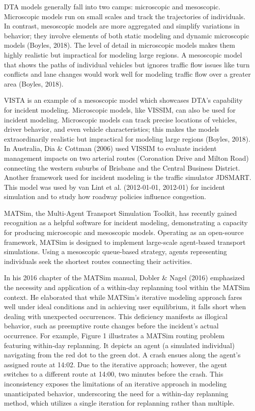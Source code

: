 \documentclass[fancy, oneside, mastersfancy, ms]{byuthesis}
\begin{document}
DTA models generally fall into two camps: microscopic and mesoscopic.
Microscopic models run on small scales and track the trajectories of
individuals. In contrast, mesoscopic models are more aggregated and
simplify variations in behavior; they involve elements of both static
modeling and dynamic microscopic models (Boyles, 2018). The level of
detail in microscopic models makes them highly realistic but impractical
for modeling large regions. A mesoscopic model that shows the paths of
individual vehicles but ignores traffic flow issues like turn conflicts
and lane changes would work well for modeling traffic flow over a
greater area (Boyles, 2018).

VISTA is an example of a mesoscopic model which showcases DTA's
capability for incident modeling. Microscopic models, like VISSIM, can
also be used for incident modeling. Microscopic models can track precise
locations of vehicles, driver behavior, and even vehicle
characteristics; this makes the models extraordinarily realistic but
impractical for modeling large regions (Boyles, 2018). In Australia, Dia
\& Cottman (2006) used VISSIM to evaluate incident management impacts on
two arterial routes (Coronation Drive and Milton Road) connecting the
western suburbs of Brisbane and the Central Business District. Another
framework used for incident modeling is the traffic simulator JDSMART.
This model was used by van Lint et al. (2012-01-01, 2012-01) for
incident simulation and to study how roadway policies influence
congestion.

MATSim, the Multi-Agent Transport Simulation Toolkit, has recently
gained recognition as a helpful software for incident modeling,
demonstrating a capacity for producing microscopic and mesoscopic
models. Operating as an open-source framework, MATSim is designed to
implement large-scale agent-based transport simulations. Using a
mesoscopic queue-based strategy, agents representing individuals seek
the shortest routes connecting their activities.

In his 2016 chapter of the MATSim manual, Dobler \& Nagel (2016)
emphasized the necessity and application of a within-day replanning tool
within the MATSim context. He elaborated that while MATSim's iterative
modeling approach fares well under ideal conditions and in achieving
user equilibrium, it falls short when dealing with unexpected
occurrences. This deficiency manifests as illogical behavior, such as
preemptive route changes before the incident's actual occurrence. For
example, Figure 1 illustrates a MATSim routing problem featuring
within-day replanning. It depicts an agent (a simulated individual)
navigating from the red dot to the green dot. A crash ensues along the
agent's assigned route at 14:02. Due to the iterative approach; however,
the agent switches to a different route at 14:00, two minutes before the
crash. This inconsistency exposes the limitations of an iterative
approach in modeling unanticipated behavior, underscoring the need for a
within-day replanning method, which utilizes a single iteration for
replanning rather than multiple.
\end{document}
